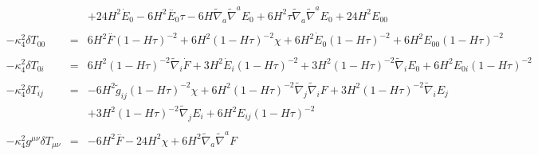 \documentclass[10pt,letterpaper]{article}
\numberwithin{equation}{section}
\begin{document}
\begin{eqnarray}
&& + 24 H^2 \dot{E}_{0}{} - 6 H^2 \overset{..}{E}_{0}{} \tau - 6 H \tilde{\nabla}_{a}\tilde{\nabla}^{a}E_{0}{} + 6 H^2 \tau \tilde{\nabla}_{a}\tilde{\nabla}^{a}E_{0}{}+24 H^2 E_{00}{}
\\ \nonumber\\ 
-\kappa^2_4 \delta T_{00}&=& 6 H^2 \overset{..}{F} (1 -  H \tau)^{-2} + 6 H^2 (1 -  H \tau)^{-2} \chi +6 H^2 \dot{E}_{0}{} (1 -  H \tau)^{-2}+6 H^2 E_{00}{} (1 -  H \tau)^{-2}
\\  \nonumber\\ 
-\kappa^2_4\delta T_{0i}&=& 6 H^2 (1 -  H \tau)^{-2} \tilde{\nabla}_{i}\dot{F}+3 H^2 \dot{E}_{i} (1 -  H \tau)^{-2} + 3 H^2 (1 -  H \tau)^{-2} \tilde{\nabla}_{i}E_{0}{}+6 H^2 E_{0i}{} (1 -  H \tau)^{-2}
\\  \nonumber\\ 
-\kappa^2_4 \delta T_{ij}&=& -6 H^2 \tilde{g}_{ij} (1 -  H \tau)^{-2} \chi + 6 H^2 (1 -  H \tau)^{-2} \tilde{\nabla}_{j}\tilde{\nabla}_{i}F+3 H^2 (1 -  H \tau)^{-2} \tilde{\nabla}_{i}E_{j} \nonumber \\ 
&& + 3 H^2 (1 -  H \tau)^{-2} \tilde{\nabla}_{j}E_{i}+6 H^2 E_{ij} (1 -  H \tau)^{-2}
\\ \nonumber\\
-\kappa^2_4 g^{\mu\nu}\delta T_{\mu\nu} &=& -6 H^2 \overset{..}{F} - 24 H^2 \chi + 6 H^2 \tilde{\nabla}_{a}\tilde{\nabla}^{a}F
\end{eqnarray}
%
%
%
\\ \\
\end{document}
